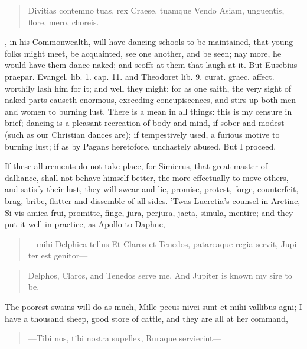 \begin{latin}
\begin{verse}
Divitias contemno tuas, rex Craese, tuamque
Vendo Asiam, unguentis, flore, mero, choreis.
\end{verse}
\end{latin}

\Plato, in his Commonwealth, will have dancing-schools to be
maintained, that young folks might meet, be acquainted, see one
another, and be seen; nay more, he would have them dance naked; and
scoffs at them that laugh at it. But Eusebius praepar. Evangel. lib. 1.
cap. 11. and Theodoret lib. 9. curat. graec. affect. worthily lash him
for it; and well they might: for as one saith, the very sight of
naked parts causeth enormous, exceeding concupiscences, and stirs up
both men and women to burning lust. There is a mean in all things: this
is my censure in brief; dancing is a pleasant recreation of body and
mind, if sober and modest (such as our Christian dances are); if
tempestively used, a furious motive to burning lust; if as by Pagans
heretofore, unchastely abused. But I proceed.

If these allurements do not take place, for Simierus, that great
master of dalliance, shall not behave himself better, the more
effectually to move others, and satisfy their lust, they will swear and
lie, promise, protest, forge, counterfeit, brag, bribe, flatter and
dissemble of all sides. 'Twas Lucretia's counsel in Aretine, Si vis
amica frui, promitte, finge, jura, perjura, jacta, simula, mentire; and
they put it well in practice, as Apollo to Daphne,

\begin{latin}
\begin{verse}
---mihi Delphica tellus
Et Claros et Tenedos, patareaque regia servit,
Jupiter est genitor---
\end{verse}
\end{latin}
\translationrule%
\begin{verse}%
Delphos, Claros, and Tenedos serve me,
And Jupiter is known my sire to be.
\end{verse}%

The poorest swains will do as much, Mille pecus nivei sunt
et mihi vallibus agni; I have a thousand sheep, good store of cattle,
and they are all at her command,

\begin{latin}
\begin{verse}
---Tibi nos, tibi nostra supellex,
Ruraque servierint---
\end{verse}
\end{latin}


